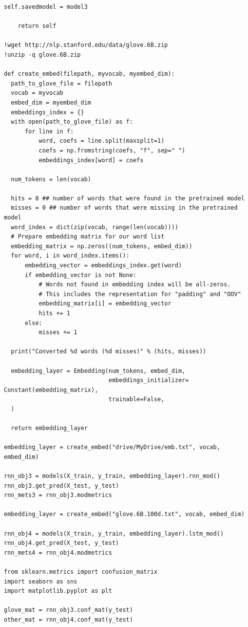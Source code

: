 \documentclass[12pt]{article}
\begin{document}
\begin{lstlisting}[breaklines]
    self.savedmodel = model3

    return self

!wget http://nlp.stanford.edu/data/glove.6B.zip
!unzip -q glove.6B.zip

def create_embed(filepath, myvocab, myembed_dim):
  path_to_glove_file = filepath
  vocab = myvocab
  embed_dim = myembed_dim
  embeddings_index = {}
  with open(path_to_glove_file) as f:
      for line in f:
          word, coefs = line.split(maxsplit=1)
          coefs = np.fromstring(coefs, "f", sep=" ")
          embeddings_index[word] = coefs

  num_tokens = len(vocab) 

  hits = 0 ## number of words that were found in the pretrained model
  misses = 0 ## number of words that were missing in the pretrained model
  word_index = dict(zip(vocab, range(len(vocab))))
  # Prepare embedding matrix for our word list
  embedding_matrix = np.zeros((num_tokens, embed_dim))
  for word, i in word_index.items():
      embedding_vector = embeddings_index.get(word)
      if embedding_vector is not None:
          # Words not found in embedding index will be all-zeros.
          # This includes the representation for "padding" and "OOV"
          embedding_matrix[i] = embedding_vector
          hits += 1
      else:
          misses += 1

  print("Converted %d words (%d misses)" % (hits, misses))

  embedding_layer = Embedding(num_tokens, embed_dim,
                              embeddings_initializer= Constant(embedding_matrix), 
                              trainable=False,
  )

  return embedding_layer

embedding_layer = create_embed("drive/MyDrive/emb.txt", vocab, embed_dim)

rnn_obj3 = models(X_train, y_train, embedding_layer).rnn_mod()
rnn_obj3.get_pred(X_test, y_test)
rnn_mets3 = rnn_obj3.modmetrics

embedding_layer = create_embed("glove.6B.100d.txt", vocab, embed_dim)

rnn_obj4 = models(X_train, y_train, embedding_layer).lstm_mod()
rnn_obj4.get_pred(X_test, y_test)
rnn_mets4 = rnn_obj4.modmetrics

from sklearn.metrics import confusion_matrix
import seaborn as sns
import matplotlib.pyplot as plt

glove_mat = rnn_obj3.conf_mat(y_test)
other_mat = rnn_obj4.conf_mat(y_test)


\end{lstlisting}
\end{document}
